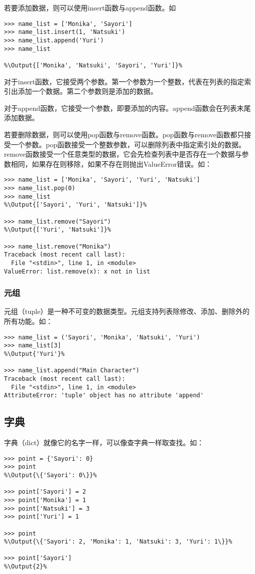 若要添加数据，则可以使用insert函数与append函数。如
\begin{lstlisting}
>>> name_list = ['Monika', 'Sayori']
>>> name_list.insert(1, 'Natsuki')
>>> name_list.append('Yuri')
>>> name_list

%\Output{['Monika', 'Natsuki', 'Sayori', 'Yuri']}%
\end{lstlisting}

对于insert函数，它接受两个参数。第一个参数为一个整数，代表在列表的指定索引出添加一个数据。第二个参数则是添加的数据。

对于append函数，它接受一个参数，即要添加的内容。append函数会在列表末尾添加数据。

若要删除数据，则可以使用pop函数与remove函数。pop函数与remove函数都只接受一个参数。pop函数接受一个整数参数，可以删除列表中指定索引处的数据。remove函数接受一个任意类型的数据，它会先检查列表中是否存在一个数据与参数相同，如果存在则移除，如果不存在则抛出ValueError错误。如：
\begin{lstlisting}
>>> name_list = ['Monika', 'Sayori', 'Yuri', 'Natsuki']
>>> name_list.pop(0)
>>> name_list
%\Output{['Sayori', 'Yuri', 'Natsuki']}%

>>> name_list.remove("Sayori")
%\Output{['Yuri', 'Natsuki']}%

>>> name_list.remove("Monika")
Traceback (most recent call last):
  File "<stdin>", line 1, in <module>
ValueError: list.remove(x): x not in list
\end{lstlisting}

\subsubsection{元组}
元组（tuple）是一种不可变的数据类型。元组支持列表除修改、添加、删除外的所有功能。如：
\begin{lstlisting}
>>> name_list = ('Sayori', 'Monika', 'Natsuki', 'Yuri')
>>> name_list[3]
%\Output{'Yuri'}%

>>> name_list.append("Main Character")
Traceback (most recent call last):
  File "<stdin>", line 1, in <module>
AttributeError: 'tuple' object has no attribute 'append'
\end{lstlisting}

\subsection{字典}
字典（dict）就像它的名字一样，可以像查字典一样取查找。如：
\begin{lstlisting}
>>> point = {'Sayori': 0}
>>> point
%\Output{\{'Sayori': 0\}}%

>>> point['Sayori'] = 2
>>> point['Monika'] = 1
>>> point['Natsuki'] = 3
>>> point['Yuri'] = 1

>>> point
%\Output{\{'Sayori': 2, 'Monika': 1, 'Natsuki': 3, 'Yuri': 1\}}%

>>> point['Sayori']
%\Output{2}%
\end{lstlisting}

